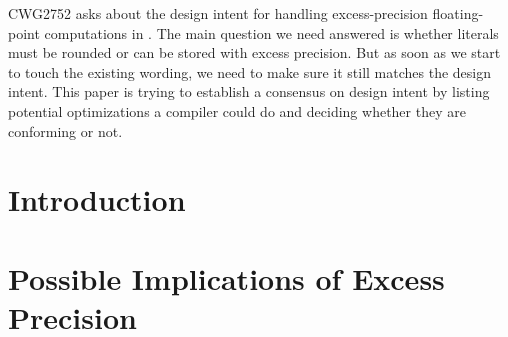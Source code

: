 \newcommand\wgTitle{Floating-Point Excess Precision}
\newcommand\wgName{Matthias Kretz <m.kretz@gsi.de>}
\newcommand\wgDocumentNumber{DFPEPR0}
\newcommand\wgGroup{SG6, EWG, CWG}
\newcommand\wgTarget{\CC{}26}

\usepackage{mymacros}
\usepackage{wg21}
\usepackage{changelog}
\usepackage{underscore}



\renewcommand{\lst}[1]{Listing~\ref{#1}}
\renewcommand{\sect}[1]{Section~\ref{#1}}
\renewcommand{\ttref}[1]{Tony~Table~\ref{#1}}


\begin{wgTitlepage}
  CWG2752 asks about the design intent for handling excess-precision
  floating-point computations in \CC{}.
  The main question we need answered is whether literals must be rounded or can
  be stored with excess precision.
  But as soon as we start to touch the existing wording, we need to make sure
  it still matches the design intent.
  This paper is trying to establish a consensus on design intent by listing
  potential optimizations a compiler could do and deciding whether they are
  conforming or not.
\end{wgTitlepage}

\pagestyle{scrheadings}

%
%

\section{Introduction}

\section{Possible Implications of Excess Precision}

